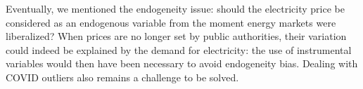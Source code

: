 Eventually, we mentioned the endogeneity issue: should the electricity price be considered as an endogenous variable from the moment energy markets were liberalized? When prices are no longer set by public authorities, their variation could indeed be explained by the demand for electricity: the use of instrumental variables would then have been necessary to avoid endogeneity bias. Dealing with COVID outliers also remains a challenge to be solved.

\newpage
